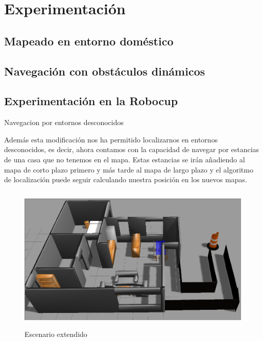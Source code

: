 \chapter{Experimentación}
\label{cap:experimentacion}

\section {Mapeado en entorno doméstico}
\label{cap:mapeadodomestico}

\section {Navegación con obstáculos dinámicos}
\label{cap:navegacionconobstaculos}

\section {Experimentación en la Robocup}
\label{cap:experimentacionrobocup}



{Navegacion por entornos desconocidos}

Además esta modificación nos ha permitido localizarnos en entornos desconocidos, es decir, ahora contamos con la capacidad de navegar por estancias de una casa que no tenemos en el mapa. Estas estancias se irán añadiendo al mapa de corto plazo primero y más tarde al mapa de largo plazo y el algoritmo de localización puede seguir calculando nuestra posición en los nuevos mapas.

\begin{figure}[hbtp]
  \begin{center}
    \includegraphics[width=12cm,height=7cm]{img/cap6/grannieAnne-ext}
  \end{center}
  \caption{Escenario extendido}
  \label{fig:grannieAnne-ext}
\end{figure}

